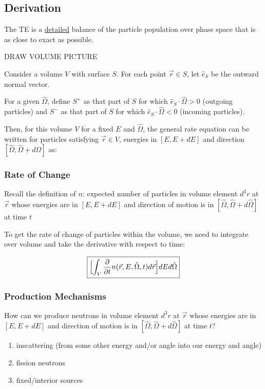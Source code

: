\documentclass[12pt]{article}
\newcommand{\vOmega}{\ensuremath{\hat{\Omega}}}
\begin{document}
\subsection{Derivation}
The TE is a \underline{detailed} balance of the particle population over phase space that is as close to exact as possible. 

DRAW VOLUME PICTURE

Consider a volume $V$ with surface $S$. For each point $\vec{r} \in S$, let $\hat{e}_S$ be the outward normal vector.

For a given $\vOmega$, define $S^+$ as that part of $S$ for which $\hat{e}_S \cdot \vOmega > 0$ (outgoing particles) and $S^-$ as that part of $S$ for which $\hat{e}_S \cdot \vOmega < 0$ (incoming particles).

Then, for this volume $V$ for a fixed $E$ and $\vOmega$, the general rate equation can be written for particles satisfying $\vec{r} \in V$, energies in $[E, E+dE]$ and direction $[\vOmega, \vOmega + d\vOmega]$ as:

\hspace*{3 em} 

\subsubsection{Rate of Change}
Recall the definition of $n$: expected number of particles in volume element $d^3r$ at $\vec{r}$ whose energies are in $[E, E + dE]$ and direction of motion is in $[\vOmega, \vOmega + d\vOmega]$ at time $t$

To get the rate of change of particles within the volume, we need to integrate over volume and take the derivative with respect to time:

\[\boxed{\Bigl[ \int_V \frac{\partial}{\partial t} n(\vec{r}, E, \vOmega, t) d\vec{r} \Bigr] dE d\vOmega }\]


\subsubsection{Production Mechanisms}
How can we produce neutrons in volume element $d^3r$ at $\vec{r}$ whose energies are in $[E, E + dE]$ and direction of motion is in $[\vOmega, \vOmega + d\vOmega]$ at time $t$?
%
\begin{enumerate}
\item inscattering (from some other energy and/or angle into our energy and angle)
\item fission neutrons 
\item fixed/interior sources
\end{enumerate}
\end{document}
